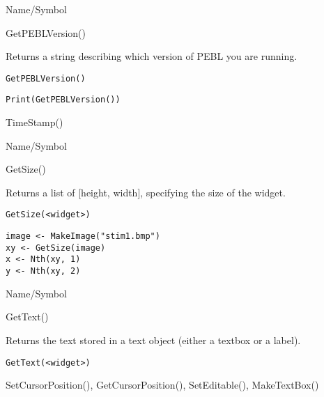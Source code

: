 \rl




\begin{desc}{Name/Symbol}
\item[Name/Symbol]	GetPEBLVersion()

\item[Description]	Returns a string describing which version of PEBL you are running.

\item[Usage]
\begin{verbatim}
GetPEBLVersion() 
\end{verbatim}

\item[Example]
\begin{verbatim}
Print(GetPEBLVersion())
\end{verbatim}

\item[See Also]	TimeStamp()
\end{desc}

\rl



\begin{desc}{Name/Symbol}
\item[Name/Symbol]	GetSize()

\item[Description]	Returns a list of [height, width], specifying the 
		size of the widget.

\item[Usage]
\begin{verbatim}
GetSize(<widget>)
\end{verbatim}

\item[Example]
\begin{verbatim}
image <- MakeImage("stim1.bmp")
xy <- GetSize(image)
x <- Nth(xy, 1)
y <- Nth(xy, 2)
\end{verbatim}

\item[See Also]	
\end{desc}

\rl



\begin{desc}{Name/Symbol}
\item[Name/Symbol]	GetText()

\item[Description]	Returns the text stored in a text object 
		(either a textbox or a label).

\item[Usage]
\begin{verbatim}
GetText(<widget>)
\end{verbatim}

\item[Example]	

\item[See Also]	SetCursorPosition(), GetCursorPosition(), SetEditable(), MakeTextBox()
\end{desc}

